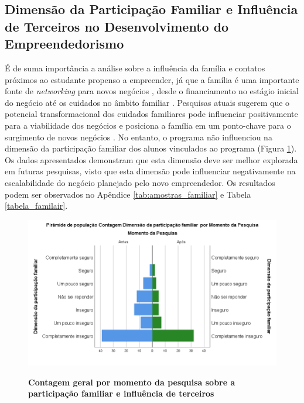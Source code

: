 \subsection{Dimensão da Participação Familiar e Influência de Terceiros no Desenvolvimento do Empreendedorismo}

É de suma importância a análise sobre a influência da família e contatos próximos ao estudante propenso a empreender, já que a família é uma importante fonte de \textit{networking} para novos negócios \cite{soto_does_2019,raza_influence_2019,kupp_when_2019}, desde o financiamento no estágio inicial do negócio \cite{soto_does_2019,edelman_impact_2016} até os cuidados no âmbito familiar \cite{meliou_family_2020}  \cite{puzi_transgenerational_2020}. Pesquisas atuais sugerem que o potencial transformacional dos cuidados familiares pode influenciar positivamente para a viabilidade dos negócios e posiciona a família em um ponto-chave para o surgimento de novos negócios \cite{georgescu_impact_2020,jena_measuring_2020,porfirio_family_2020}. No entanto, o programa não influenciou na dimensão da participação familiar dos alunos vinculados ao programa (Figura \ref{figura_60}). Os dados apresentados demonstram que esta dimensão deve ser melhor explorada em futuras pesquisas, visto que esta dimensão pode influenciar negativamente na escalabilidade do negócio planejado pelo novo empreendedor. Os resultados podem ser observados no Apêndice \ref{tab:amostras_familiar} e Tabela \ref{tabela_familair}.


\begin{figure}[H]
\centering
\caption{\textbf{Contagem geral por momento da pesquisa sobre a participação familiar e influência de terceiros}}
\includegraphics[scale=0.4]{Imagens/dimensao_familiar.png}
\label{figura_60}
\end{figure}

